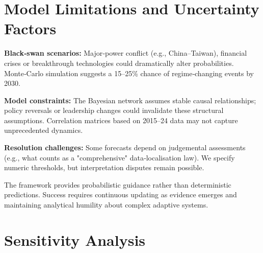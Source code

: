 \documentclass[12pt]{article}
\begin{document}
\section{Model Limitations and Uncertainty Factors}

\textbf{Black‑swan scenarios:} Major‑power conflict (e.g., China–Taiwan), financial crises or breakthrough technologies could dramatically alter probabilities.  Monte‑Carlo simulation suggests a 15–25\% chance of regime‑changing events by 2030.

\textbf{Model constraints:} The Bayesian network assumes stable causal relationships; policy reversals or leadership changes could invalidate these structural assumptions.  Correlation matrices based on 2015–24 data may not capture unprecedented dynamics.

\textbf{Resolution challenges:} Some forecasts depend on judgemental assessments (e.g., what counts as a "comprehensive" data‑localisation law).  We specify numeric thresholds, but interpretation disputes remain possible.

The framework provides probabilistic guidance rather than deterministic predictions.  Success requires continuous updating as evidence emerges and maintaining analytical humility about complex adaptive systems.

\section{Sensitivity Analysis}



\pagebreak
\end{document}
